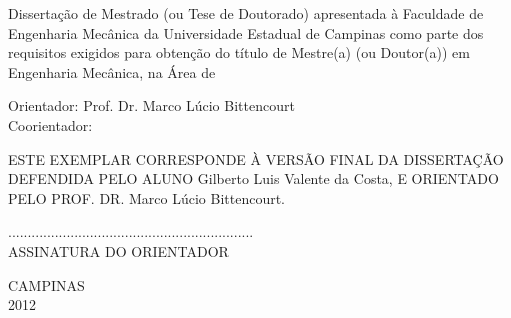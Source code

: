 \vspace{0.5cm}

\begin{flushright}
\parbox{3.5in}{ Dissertação de Mestrado (ou Tese de Doutorado) apresentada à Faculdade de 
Engenharia Mecânica da Universidade Estadual de Campinas como parte dos requisitos exigidos para 
obtenção do título de Mestre(a) (ou Doutor(a)) em Engenharia Mecânica, na Área de }
\end{flushright}

\vspace{0.5cm}
\noindent
Orientador: Prof. Dr. Marco Lúcio Bittencourt\\
Coorientador:

\vspace{0.4cm}
\begin{flushleft}
\parbox{3.5in}{ESTE EXEMPLAR CORRESPONDE À VERSÃO FINAL DA DISSERTAÇÃO DEFENDIDA PELO ALUNO
Gilberto Luis Valente da Costa, E
ORIENTADO PELO PROF. DR.
Marco Lúcio Bittencourt.
\begin{center}
...............................................................\\
ASSINATURA DO ORIENTADOR
\end{center}
}
\end{flushleft}

\vspace{0.4cm}
\begin{center}
CAMPINAS\\ 2012
\end{center}


\clearpage
\setcounter{page}{4}

